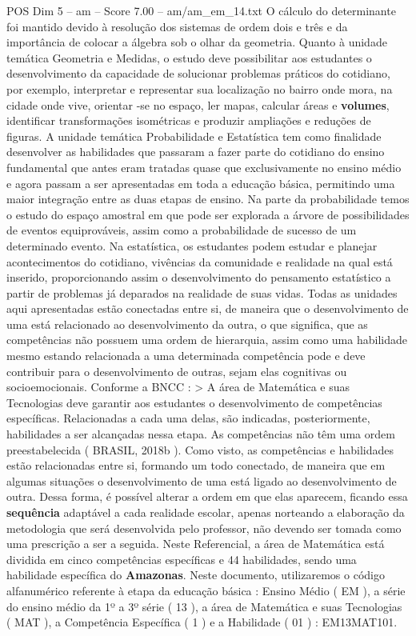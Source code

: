 \begin{textsample}{POS Dim 5 – am – Score 7.00 – am/am\_em\_14.txt}
O cálculo do determinante foi mantido devido à resolução dos sistemas de ordem dois e três e da importância de colocar a álgebra sob o olhar da geometria.
Quanto à unidade temática Geometria e Medidas, o estudo deve possibilitar aos estudantes o desenvolvimento da capacidade de solucionar problemas práticos do cotidiano, por exemplo, interpretar e representar sua localização no bairro onde mora, na cidade onde vive, orientar -se no espaço, ler mapas, calcular áreas e \textbf{volumes}, identificar transformações isométricas e produzir ampliações e reduções de figuras.
A unidade temática Probabilidade e Estatística tem como finalidade desenvolver as habilidades que passaram a fazer parte do cotidiano do ensino fundamental que antes eram tratadas quase que exclusivamente no ensino médio e agora passam a ser apresentadas em toda a educação básica, permitindo uma maior integração entre as duas etapas de ensino.
Na parte da probabilidade temos o estudo do espaço amostral em que pode ser explorada a árvore de possibilidades de eventos equiprováveis, assim como a probabilidade de sucesso de um determinado evento.
Na estatística, os estudantes podem estudar e planejar acontecimentos do cotidiano, vivências da comunidade e realidade na qual está inserido, proporcionando assim o desenvolvimento do pensamento estatístico a partir de problemas já deparados na realidade de suas vidas.
Todas as unidades aqui apresentadas estão conectadas entre si, de maneira que o desenvolvimento de uma está relacionado ao desenvolvimento da outra, o que significa, que as competências não possuem uma ordem de hierarquia, assim como uma habilidade mesmo estando relacionada a uma determinada competência pode e deve contribuir para o desenvolvimento de outras, sejam elas cognitivas ou socioemocionais.
Conforme a BNCC : > A área de Matemática e suas Tecnologias deve garantir aos estudantes o desenvolvimento de competências específicas.
Relacionadas a cada uma delas, são indicadas, posteriormente, habilidades a ser alcançadas nessa etapa.
As competências não têm uma ordem preestabelecida ( BRASIL, 2018b ).
Como visto, as competências e habilidades estão relacionadas entre si, formando um todo conectado, de maneira que em algumas situações o desenvolvimento de uma está ligado ao desenvolvimento de outra.
Dessa forma, é possível alterar a ordem em que elas aparecem, ficando essa \textbf{sequência} adaptável a cada realidade escolar, apenas norteando a elaboração da metodologia que será desenvolvida pelo professor, não devendo ser tomada como uma prescrição a ser a seguida.
Neste Referencial, a área de Matemática está dividida em cinco competências específicas e 44 habilidades, sendo uma habilidade específica do \textbf{Amazonas}.
Neste documento, utilizaremos o código alfanumérico referente à etapa da educação básica : Ensino Médio ( EM ), a série do ensino médio da 1º a 3º série ( 13 ), a área de Matemática e suas Tecnologias ( MAT ), a Competência Específica ( 1 ) e a Habilidade ( 01 ) : EM13MAT101.

\end{textsample}
